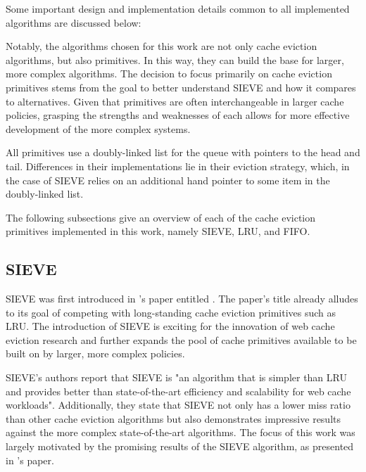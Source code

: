 Some important design and implementation details common to all implemented algorithms are discussed below:


\begin{description}[style=unboxed, leftmargin=0cm]
    \item[Primitives] Notably, the algorithms chosen for this work are not only cache eviction algorithms, but also primitives. In this way, they can build the base for larger, more complex algorithms. The decision to focus primarily on cache eviction primitives stems from the goal to better understand SIEVE and how it compares to alternatives. Given that primitives are often interchangeable in larger cache policies, grasping the strengths and weaknesses of each allows for more effective development of the more complex systems.
    \item[Data structures] All primitives use a doubly-linked list for the queue with pointers to the head and tail. Differences in their implementations lie in their eviction strategy, which, in the case of SIEVE relies on an additional hand pointer to some item in the doubly-linked list.
\end{description}

The following subsections give an overview of each of the cache eviction primitives implemented in this work, namely SIEVE, LRU, and FIFO.

\subsection{SIEVE}

SIEVE was first introduced in \citeauthor{sieve}'s \citeyear{sieve} paper entitled \textit{}. The paper's title already alludes to its goal of competing with long-standing cache eviction primitives such as LRU. The introduction of SIEVE is exciting for the innovation of web cache eviction research and further expands the pool of cache primitives available to be built on by larger, more complex policies.

SIEVE's authors report that SIEVE is "an algorithm that is simpler than LRU and provides better than state-of-the-art efficiency and scalability for web cache workloads". Additionally, they state that SIEVE not only has a lower miss ratio than other cache eviction algorithms but also demonstrates impressive results against the more complex state-of-the-art algorithms. The focus of this work was largely motivated by the promising results of the SIEVE algorithm, as presented in \citeauthor{sieve}'s paper.


